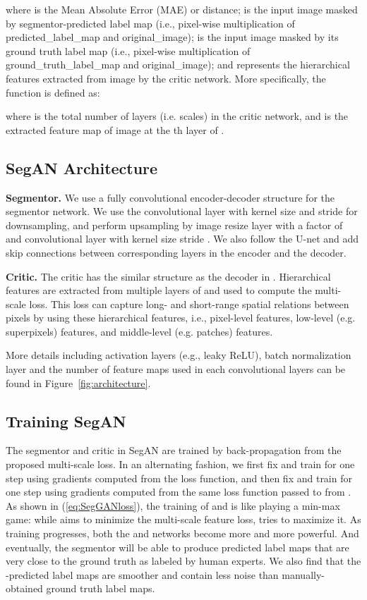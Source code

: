 \documentclass[twocolumn]{svjour3}
\begin{document}
where  is the Mean Absolute Error (MAE) or  distance;
 is the input image masked by segmentor-predicted label map (i.e., pixel-wise multiplication of predicted\_label\_map and original\_image);  is the input image masked by its ground truth label map (i.e., pixel-wise multiplication of ground\_truth\_label\_map and original\_image); and  represents the hierarchical features extracted from image  by the critic network. More specifically, the  function is defined as:

where  is the total number of layers (i.e. scales) in the critic network, and  is the extracted feature map of image  at the th layer of .






\subsection{SegAN Architecture}


\textbf{Segmentor.} We use a fully convolutional encoder-decoder structure for the segmentor  network.
We use the convolutional layer with kernel size  and stride  for downsampling, and perform upsampling by image resize layer with a factor of  and convolutional layer with kernel size  stride .
We also follow the U-net and add skip connections between corresponding layers in the encoder and the decoder.

\noindent\textbf{Critic.}
The critic  has the similar structure as the decoder in .
Hierarchical features are extracted from multiple layers of  and used to compute the multi-scale  loss.
This loss can capture long- and short-range spatial relations between pixels by using these hierarchical features, i.e., pixel-level features, low-level (e.g. superpixels) features, and middle-level (e.g. patches) features.

More details including activation layers (e.g.,  leaky ReLU), batch normalization layer and the number of feature maps used in each convolutional layers can be found in Figure~\ref{fig:architecture}.



\subsection{Training SegAN}

The segmentor  and critic  in SegAN are trained by back-propagation from the proposed multi-scale  loss.  In an alternating fashion, we first fix  and  train  for one step using gradients computed from the loss function, and then fix  and train  for one step using gradients computed from the same loss function passed to  from .
As shown in (\ref{eq:SegGANloss}), the training of  and  is like playing a min-max game: while  aims to minimize the multi-scale feature loss,  tries to maximize it. As training progresses, both the  and  networks become more and more powerful. And eventually, the segmentor will be able to produce predicted label maps that are very close to the ground truth as labeled by human experts. We also find that the -predicted label maps are smoother and contain less noise than manually-obtained ground truth label maps.
\end{document}
